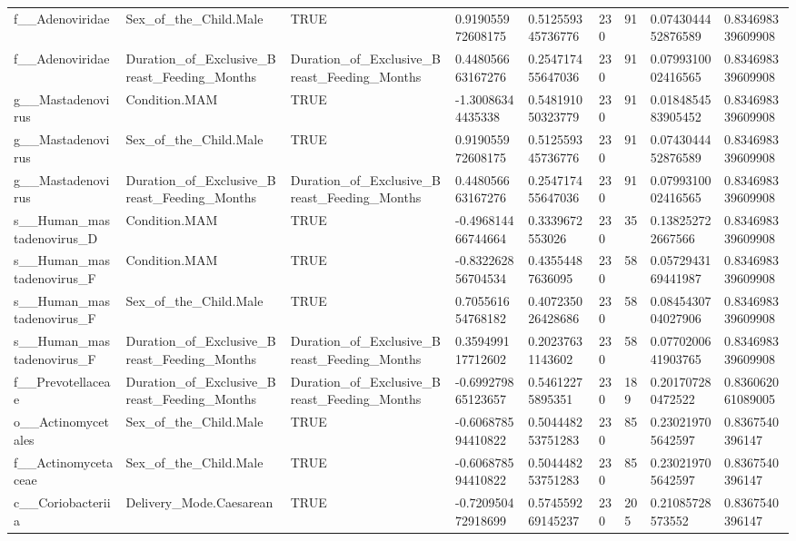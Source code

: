\begin{longtable}{lllllllll}
f\_\_Adenoviridae & Sex\_of\_the\_Child.Male & TRUE & 0.919055972608175 & 0.512559345736776 & 230 & 91 & 0.0743044452876589 & 0.834698339609908 \\
f\_\_Adenoviridae & Duration\_of\_Exclusive\_Breast\_Feeding\_Months & Duration\_of\_Exclusive\_Breast\_Feeding\_Months & 0.448056663167276 & 0.254717455647036 & 230 & 91 & 0.0799310002416565 & 0.834698339609908 \\
g\_\_Mastadenovirus & Condition.MAM & TRUE & -1.30086344435338 & 0.548191050323779 & 230 & 91 & 0.0184854583905452 & 0.834698339609908 \\
g\_\_Mastadenovirus & Sex\_of\_the\_Child.Male & TRUE & 0.919055972608175 & 0.512559345736776 & 230 & 91 & 0.0743044452876589 & 0.834698339609908 \\
g\_\_Mastadenovirus & Duration\_of\_Exclusive\_Breast\_Feeding\_Months & Duration\_of\_Exclusive\_Breast\_Feeding\_Months & 0.448056663167276 & 0.254717455647036 & 230 & 91 & 0.0799310002416565 & 0.834698339609908 \\
s\_\_Human\_mastadenovirus\_D & Condition.MAM & TRUE & -0.496814466744664 & 0.3339672553026 & 230 & 35 & 0.138252722667566 & 0.834698339609908 \\
s\_\_Human\_mastadenovirus\_F & Condition.MAM & TRUE & -0.832262856704534 & 0.43554487636095 & 230 & 58 & 0.0572943169441987 & 0.834698339609908 \\
s\_\_Human\_mastadenovirus\_F & Sex\_of\_the\_Child.Male & TRUE & 0.705561654768182 & 0.407235026428686 & 230 & 58 & 0.0845430704027906 & 0.834698339609908 \\
s\_\_Human\_mastadenovirus\_F & Duration\_of\_Exclusive\_Breast\_Feeding\_Months & Duration\_of\_Exclusive\_Breast\_Feeding\_Months & 0.359499117712602 & 0.20237631143602 & 230 & 58 & 0.0770200641903765 & 0.834698339609908 \\
f\_\_Prevotellaceae & Duration\_of\_Exclusive\_Breast\_Feeding\_Months & Duration\_of\_Exclusive\_Breast\_Feeding\_Months & -0.699279865123657 & 0.54612275895351 & 230 & 189 & 0.201707280472522 & 0.836062061089005 \\
o\_\_Actinomycetales & Sex\_of\_the\_Child.Male & TRUE & -0.606878594410822 & 0.504448253751283 & 230 & 85 & 0.230219705642597 & 0.8367540396147 \\
f\_\_Actinomycetaceae & Sex\_of\_the\_Child.Male & TRUE & -0.606878594410822 & 0.504448253751283 & 230 & 85 & 0.230219705642597 & 0.8367540396147 \\
c\_\_Coriobacteriia & Delivery\_Mode.Caesarean & TRUE & -0.720950472918699 & 0.574559269145237 & 230 & 205 & 0.21085728573552 & 0.8367540396147 \\

\end{longtable}
